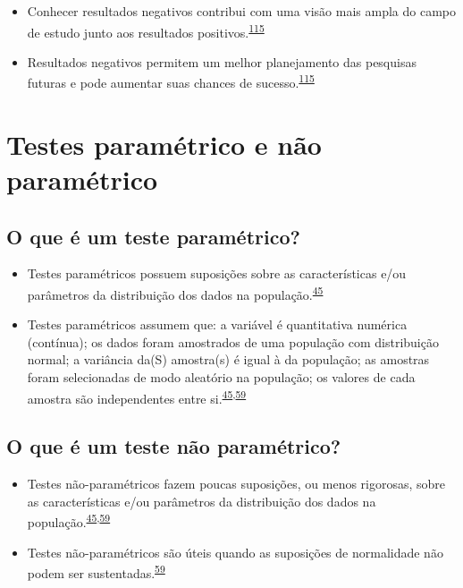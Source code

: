 \documentclass[
  a4paper,
]{book}
\begin{document}
\begin{itemize}
\item
  Conhecer resultados negativos contribui com uma visão mais ampla do campo de estudo junto aos resultados positivos.\textsuperscript{\protect\hyperlink{ref-weintraub2016}{115}}
\item
  Resultados negativos permitem um melhor planejamento das pesquisas futuras e pode aumentar suas chances de sucesso.\textsuperscript{\protect\hyperlink{ref-weintraub2016}{115}}
\end{itemize}

\hypertarget{parametric-naoparametrico}{%
\section{Testes paramétrico e não paramétrico}\label{parametric-naoparametrico}}

\hypertarget{o-que-uxe9-um-teste-paramuxe9trico}{%
\subsection{O que é um teste paramétrico?}\label{o-que-uxe9-um-teste-paramuxe9trico}}

\begin{itemize}
\item
  Testes paramétricos possuem suposições sobre as características e/ou parâmetros da distribuição dos dados na população.\textsuperscript{\protect\hyperlink{ref-vetter2017}{45}}
\item
  Testes paramétricos assumem que: a variável é quantitativa numérica (contínua); os dados foram amostrados de uma população com distribuição normal; a variância da(S) amostra(s) é igual à da população; as amostras foram selecionadas de modo aleatório na população; os valores de cada amostra são independentes entre si.\textsuperscript{\protect\hyperlink{ref-vetter2017}{45},\protect\hyperlink{ref-Ali2016}{59}}
\end{itemize}

\hypertarget{o-que-uxe9-um-teste-nuxe3o-paramuxe9trico}{%
\subsection{O que é um teste não paramétrico?}\label{o-que-uxe9-um-teste-nuxe3o-paramuxe9trico}}

\begin{itemize}
\item
  Testes não-paramétricos fazem poucas suposições, ou menos rigorosas, sobre as características e/ou parâmetros da distribuição dos dados na população.\textsuperscript{\protect\hyperlink{ref-vetter2017}{45},\protect\hyperlink{ref-Ali2016}{59}}
\item
  Testes não-paramétricos são úteis quando as suposições de normalidade não podem ser sustentadas.\textsuperscript{\protect\hyperlink{ref-Ali2016}{59}}
\end{itemize}
\end{document}
